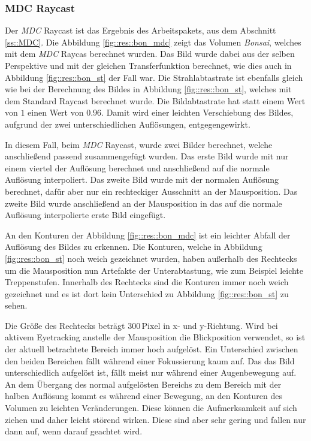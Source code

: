 \subsubsection{MDC Raycast}\label{ss::res::mdc}
Der \emph{MDC} Raycast ist das Ergebnis des Arbeitspakets, aus dem Abschnitt \ref{ss::MDC}.
Die Abbildung \ref{fig::res::bon_mdc} zeigt das Volumen \emph{Bonsai}, welches mit dem \emph{MDC} Raycas berechnet wurden.
Das Bild wurde dabei aus der selben Perspektive und mit der gleichen Transferfunktion berechnet, wie dies auch in Abbildung \ref{fig::res::bon_st} der Fall war.
Die Strahlabtastrate ist ebenfalls gleich wie bei der Berechnung des Bildes in Abbildung \ref{fig::res::bon_st}, welches mit dem Standard Raycast berechnet wurde.
Die Bildabtastrate hat statt einem Wert von $1$ einen Wert von $0.96$.
Damit wird einer leichten Verschiebung des Bildes, aufgrund der zwei unterschiedlichen Auflösungen, entgegengewirkt.

In diesem Fall, beim \emph{MDC} Raycast, wurde zwei Bilder berechnet, welche anschließend passend zusammengefügt wurden.
Das erste Bild wurde mit nur einem viertel der Auflösung berechnet und anschließend auf die normale Auflösung interpoliert.
Das zweite Bild wurde mit der normalen Auflösung berechnet, dafür aber nur ein rechteckiger Ausschnitt an der Mausposition.
Das zweite Bild wurde anschließend an der Mausposition in das auf die normale Auflösung interpolierte erste Bild eingefügt.

An den Konturen der Abbildung \ref{fig::res::bon_mdc} ist ein leichter Abfall der Auflösung des Bildes zu erkennen.
Die Konturen, welche in Abbildung \ref{fig::res::bon_st} noch weich gezeichnet wurden, haben außerhalb des Rechtecks um die Mausposition nun Artefakte der Unterabtastung, wie zum Beispiel leichte Treppenstufen.
Innerhalb des Rechtecks sind die Konturen immer noch weich gezeichnet und es ist dort kein Unterschied zu Abbildung \ref{fig::res::bon_st} zu sehen.

Die Größe des Rechtecks beträgt $300$\,Pixel in x- und y-Richtung.
Wird bei aktivem Eyetracking anstelle der Mausposition die Blickposition verwendet, so ist der aktuell betrachtete Bereich immer hoch aufgelöst.
Ein Unterschied zwischen den beiden Bereichen fällt während einer Fokussierung kaum auf.
Das das Bild unterschiedlich aufgelöst ist, fällt meist nur während einer Augenbewegung auf.
An dem Übergang des normal aufgelösten Bereichs zu dem Bereich mit der halben Auflösung kommt es während einer Bewegung, an den Konturen des Volumen zu leichten Veränderungen.
Diese können die Aufmerksamkeit auf sich ziehen und daher leicht störend wirken.
Diese sind aber sehr gering und fallen nur dann auf, wenn darauf geachtet wird.

